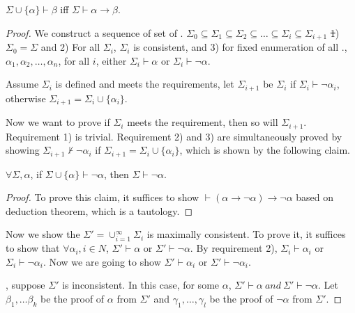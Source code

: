 \begin{theorem}
  $\Sigma \cup \{ \alpha \} \vdash \beta$ iff $\Sigma \vdash \alpha \rightarrow \beta$.
\end{theorem}




\begin{proof}
We construct a sequence of set of \wff. $\Sigma_0 \subseteq \Sigma_1 \subseteq \Sigma_2 \subseteq \ldots \subseteq \Sigma_i \subseteq \Sigma_{i+1}$ \st 1) $\Sigma_0 = \Sigma$ and 2) For all $\Sigma_i$, $\Sigma_i$ is consistent, and 3) for fixed enumeration of all \wff., $\alpha_1, \alpha_2, \ldots, \alpha_n$, for all $i$, either $\Sigma_i \vdash \alpha$ or $\Sigma_i \vdash \neg \alpha$.

Assume $\Sigma_i$ is defined and meets the requirements, let $\Sigma_{i+1}$ be $\Sigma_i$ if $\Sigma_i \vdash \neg \alpha_{i}$, otherwise $\Sigma_{i+1} = \Sigma_i \cup \{ \alpha_i \}$. 

Now we want to prove if $\Sigma_i$ meets the requirement, then so will $\Sigma_{i+1}$.
Requirement 1) is trivial. Requirement 2) and 3) are simultaneously proved by showing $\Sigma_{i+1} \nvdash \neg \alpha_i$ if $\Sigma_{i+1} = \Sigma_i \cup \{\alpha_i\}$, which is shown by the following claim.

\begin{claim}
  $\forall \Sigma, \alpha$, if $\Sigma \cup \{ \alpha \} \vdash \neg \alpha$, then $\Sigma \vdash \neg \alpha$. 
\end{claim}
\begin{proof}
  To prove this claim, it suffices to show $\vdash (\alpha \rightarrow \neg \alpha) \rightarrow \neg \alpha$ based on deduction theorem, which is a tautology.
\end{proof}

Now we show the $\Sigma'=\cup_{i=1}^\infty \Sigma_i$ is maximally consistent.
To prove it, it suffices to show that $\forall \alpha_i, i \in N$, $\Sigma' \vdash \alpha$ or $\Sigma' \vdash \neg \alpha$.
By requirement 2), $\Sigma_i \vdash \alpha_i$ or $\Sigma_i \vdash \neg \alpha_i$. Now we are going to show $\Sigma' \vdash \alpha_i$ or $\Sigma' \vdash \neg \alpha_i$.

\bwoc, suppose $\Sigma'$ is inconsistent. In this case, for some $\alpha$, $\Sigma'\vdash\alpha\ and\ \Sigma'\vdash\neg\alpha$. Let $\beta_1,\ldots\beta_k$ be the proof of $\alpha$ from $\Sigma'$ and $\gamma_1,\ldots,\gamma_l$ be the proof of $\neg\alpha$ from $\Sigma'$.


\end{proof}
